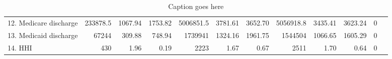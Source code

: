 \documentclass{article}
\begin{document}
\begin{landscape}
\begin{table}[ht]
\begin{tabular}{p{3cm}rrr|rrr|rrr|rr}
					12. Medicare discharge & 233878.5 & 1067.94 & 1753.82 & 5006851.5 & 3781.61 & 3652.70 & 5056918.8 & 3435.41 & 3623.24 & 0 \\
					13. Medicaid discharge & 67244 & 309.88 & 748.94 & 1739941 & 1324.16 & 1961.75 & 1544504 & 1066.65 & 1605.29 & 0 \\
					14. HHI & 430 & 1.96 & 0.19 & 2223 & 1.67 & 0.67 & 2511 & 1.70 & 0.64 & 0 \\
					\bottomrule
				\end{tabular}
			\caption{Caption goes here}
		\end{table}
		
	\end{landscape}
	
	
	
	
\end{document}
